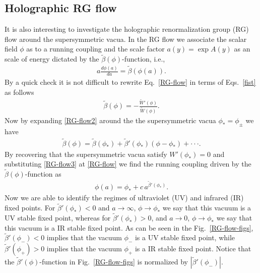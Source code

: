 \documentclass[aps,12pt, a4paper,nofootinbib]{revtex4}
\begin{document}
{\subsection{Holographic RG flow}

It is also interesting to investigate the holographic renormalization group (RG) flow around the supersymmetric vacua.  In the RG flow we associate the scalar field $\phi$ as to a running coupling and the scale factor $a(y)=\exp{A(y)}$ as an scale of energy dictated by the $\tilde{\beta}(\phi)$-function, i.e., 
\begin{eqnarray}\label{RG-flow}
a\frac{d\phi(a)}{da}=\tilde{\beta}(\phi(a)).
\end{eqnarray}
By a quick check it is not difficult to rewrite Eq.~\eqref{RG-flow} in terms of Eqs.~\eqref{fist} as follows
\begin{eqnarray}\label{RG-flow2}
\tilde{\beta}(\phi)=-\frac{\tilde{W}'(\phi)}{\tilde{W}(\phi)}.
\end{eqnarray}
Now by expanding \eqref{RG-flow2} around the the supersymmetric vacua $\phi_*=\phi_\pm$ we have 
\begin{eqnarray}\label{RG-flow3}
\tilde{\beta}(\phi)=\tilde{\beta}(\phi_*)+\tilde{\beta}'(\phi_*) (\phi-\phi_*)+\cdot\cdot\cdot.
\end{eqnarray}
By recovering that the supersymmetric vacua satisfy $W'(\phi_*)=0$ and substituting \eqref{RG-flow3} at \eqref{RG-flow} we find the running coupling driven by the $\tilde{\beta}(\phi)$-function as 
\begin{eqnarray}\label{RG-flow4}
\phi(a)=\phi_* + c\, a^{\tilde{\beta}'(\phi_*)}.
\end{eqnarray}
Now we are able to identify the regimes of ultraviolet (UV) and infrared (IR) fixed points. For $\tilde{\beta}'(\phi_*)<0$ and $a\to\infty$, $\phi\to\phi_*$ we say that this vacuum is a UV stable fixed point, whereas for $\tilde{\beta}'(\phi_*)>0$, and $a\to0$, $\phi\to\phi_*$ we say that this vacuum is a IR stable fixed point. As can be seen in the Fig.~\ref{RG-flow-figs},  $\tilde{\beta}'(\phi_-)<0$ implies that the vacuum $\phi_-$ is a UV stable fixed point, while $\tilde{\beta}'(\phi_+)>0$ implies that the vacuum $\phi_+$ is a IR stable fixed point. Notice that the $\tilde{\beta}'(\phi)$-function in Fig.~\ref{RG-flow-figs} is normalized by $|\tilde{\beta}'(\phi_-)|$. 

}
\end{document}
